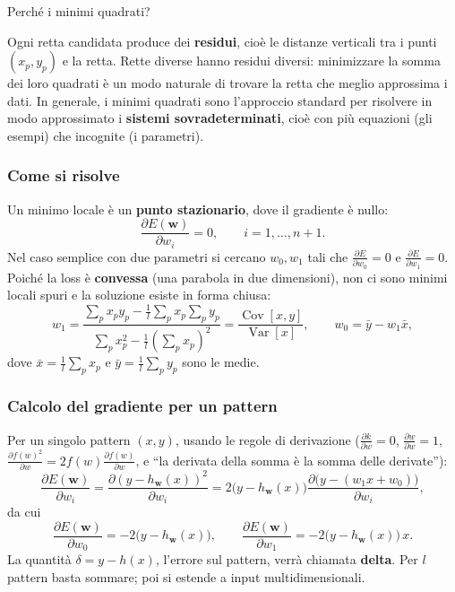 \begin{boxtip}{Perché i minimi quadrati?}

Ogni retta candidata produce dei \textbf{residui}, cioè le distanze
verticali tra i punti \((x_p, y_p)\) e la retta. Rette diverse hanno
residui diversi: minimizzare la somma dei loro quadrati è un modo
naturale di trovare la retta che meglio approssima i dati. In generale,
i minimi quadrati sono l'approccio standard per risolvere in modo
approssimato i \textbf{sistemi sovradeterminati}, cioè con più equazioni
(gli esempi) che incognite (i parametri).

\end{boxtip}

\subsubsection{Come si risolve}\label{come-si-risolve}

Un minimo locale è un \textbf{punto stazionario}, dove il gradiente è
nullo: \[
\frac{\partial E(\mathbf{w})}{\partial w_i} = 0, \qquad i = 1, \dots, n+1.
\] Nel caso semplice con due parametri si cercano \(w_0, w_1\) tali che
\(\frac{\partial E}{\partial w_0} = 0\) e
\(\frac{\partial E}{\partial w_1} = 0\). Poiché la loss è
\textbf{convessa} (una parabola in due dimensioni), non ci sono minimi
locali spuri e la soluzione esiste in forma chiusa: \[
w_1 = \frac{\sum_p x_p y_p - \frac{1}{l}\sum_p x_p \sum_p y_p}{\sum_p x_p^2 - \frac{1}{l}\left(\sum_p x_p\right)^2} = \frac{\operatorname{Cov}[x,y]}{\operatorname{Var}[x]}, \qquad w_0 = \bar{y} - w_1 \bar{x},
\] dove \(\bar{x} = \frac{1}{l}\sum_p x_p\) e
\(\bar{y} = \frac{1}{l}\sum_p y_p\) sono le medie.

\subsubsection{Calcolo del gradiente per un
pattern}\label{calcolo-del-gradiente-per-un-pattern}

Per un singolo pattern \((x, y)\), usando le regole di derivazione
(\(\frac{\partial k}{\partial w} = 0\),
\(\frac{\partial w}{\partial w} = 1\),
\(\frac{\partial f(w)^2}{\partial w} = 2 f(w) \frac{\partial f(w)}{\partial w}\),
e ``la derivata della somma è la somma delle derivate''): \[
\frac{\partial E(\mathbf{w})}{\partial w_i} = \frac{\partial (y - h_\mathbf{w}(x))^2}{\partial w_i} = 2\big(y - h_\mathbf{w}(x)\big) \frac{\partial \big(y - (w_1 x + w_0)\big)}{\partial w_i},
\] da cui \[
\frac{\partial E(\mathbf{w})}{\partial w_0} = -2\big(y - h_\mathbf{w}(x)\big), \qquad \frac{\partial E(\mathbf{w})}{\partial w_1} = -2\big(y - h_\mathbf{w}(x)\big)\, x.
\] La quantità \(\delta = y - h(x)\), l'errore sul pattern, verrà
chiamata \textbf{delta}. Per \(l\) pattern basta sommare; poi si estende
a input multidimensionali.

